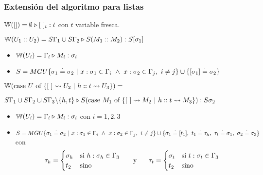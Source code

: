 \subsubsection{Extensión del algoritmo para listas}
$\mathbb{W}([]) = \emptyset\triangleright [~]_{t} : t$ con $t$ variable fresca.

$\mathbb{W}(U_1::U_2) = S\Gamma_1\cup S\Gamma_2\triangleright S(M_1::M_2) : S[\sigma_1]$

\begin{centrado}
	\begin{itemize}
		\item $\mathbb{W}(U_i) = \Gamma_i\triangleright M_i : \sigma_i$
		\item $S = MGU\{\sigma_1\overset{\cdot}{=} \sigma_2~|~x:\sigma_1\in\Gamma_i~\land~x:\sigma_2\in\Gamma_j,~i\neq j\}\cup\{[\sigma_1]\overset{\cdot}{=}\sigma_2\} $
	\end{itemize}
\end{centrado}


$\mathbb{W}(\text{case } U \text{ of } \{[~]\leadsto U_2~|~h::t\leadsto U_3\}) =$

\quad$S\Gamma_1\cup S\Gamma_2\cup S\Gamma_3\backslash\{h,t\}\triangleright S(\text{case } M_1 \text{ of } \{[~]\leadsto M_2~|~h::t\leadsto M_3\}) : S\sigma_2$

\begin{centrado}
	\begin{itemize}
		\item $\mathbb{W}(U_i) = \Gamma_i\triangleright M_i : \sigma_i$ con $i = 1,2,3$
		\item $S = MGU\{\sigma_1\overset{\cdot}{=} \sigma_2~|~x:\sigma_1\in\Gamma_i~\land~x:\sigma_2\in\Gamma_j,~i\neq j\}\cup\{\sigma_1\overset{\cdot}{=} [t_1],~t_1\overset{\cdot}{=} \tau_h,~\tau_t\overset{\cdot}{=} \sigma_1,~\sigma_2\overset{\cdot}{=}\sigma_3\} $ con 
		\[ \tau_h = \begin{cases} 
		\sigma_h & \text{si } h:\sigma_h\in\Gamma_3 \\
		t_2 & \text{sino} \\
		\end{cases} \hspace*{5mm}\text{ y }\hspace*{5mm}
		\tau_t = \begin{cases} 
		\sigma_t & \text{si } t:\sigma_t\in\Gamma_3 \\
		t_2 & \text{sino} \\
		\end{cases}
		\]
	\end{itemize}
\end{centrado}